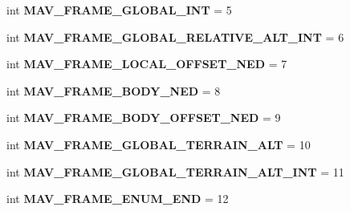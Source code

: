\begin{DoxyCompactItemize}
\item 
\mbox{\label{namespacepymavlink_1_1dialects_1_1v10_a7505e0831f3f4c8ef6e021f8d89be196}} 
int {\bfseries M\+A\+V\+\_\+\+F\+R\+A\+M\+E\+\_\+\+G\+L\+O\+B\+A\+L\+\_\+\+I\+NT} = 5
\item 
\mbox{\label{namespacepymavlink_1_1dialects_1_1v10_a5db5903baa397a551a9587f81c3d21b1}} 
int {\bfseries M\+A\+V\+\_\+\+F\+R\+A\+M\+E\+\_\+\+G\+L\+O\+B\+A\+L\+\_\+\+R\+E\+L\+A\+T\+I\+V\+E\+\_\+\+A\+L\+T\+\_\+\+I\+NT} = 6
\item 
\mbox{\label{namespacepymavlink_1_1dialects_1_1v10_aa8f0bfdb8cbfd660055834445a31e715}} 
int {\bfseries M\+A\+V\+\_\+\+F\+R\+A\+M\+E\+\_\+\+L\+O\+C\+A\+L\+\_\+\+O\+F\+F\+S\+E\+T\+\_\+\+N\+ED} = 7
\item 
\mbox{\label{namespacepymavlink_1_1dialects_1_1v10_afa563258dc6554e4221e6841620743ad}} 
int {\bfseries M\+A\+V\+\_\+\+F\+R\+A\+M\+E\+\_\+\+B\+O\+D\+Y\+\_\+\+N\+ED} = 8
\item 
\mbox{\label{namespacepymavlink_1_1dialects_1_1v10_ac4415789178ef45d0515d368e2e76ae8}} 
int {\bfseries M\+A\+V\+\_\+\+F\+R\+A\+M\+E\+\_\+\+B\+O\+D\+Y\+\_\+\+O\+F\+F\+S\+E\+T\+\_\+\+N\+ED} = 9
\item 
\mbox{\label{namespacepymavlink_1_1dialects_1_1v10_ac932a6a37e76e05f1680f92688b38385}} 
int {\bfseries M\+A\+V\+\_\+\+F\+R\+A\+M\+E\+\_\+\+G\+L\+O\+B\+A\+L\+\_\+\+T\+E\+R\+R\+A\+I\+N\+\_\+\+A\+LT} = 10
\item 
\mbox{\label{namespacepymavlink_1_1dialects_1_1v10_a68e7d3a8b44c035a0551dd59724d81e5}} 
int {\bfseries M\+A\+V\+\_\+\+F\+R\+A\+M\+E\+\_\+\+G\+L\+O\+B\+A\+L\+\_\+\+T\+E\+R\+R\+A\+I\+N\+\_\+\+A\+L\+T\+\_\+\+I\+NT} = 11
\item 
\mbox{\label{namespacepymavlink_1_1dialects_1_1v10_a0824dafa58e145f86e62a0dd077761a9}} 
int {\bfseries M\+A\+V\+\_\+\+F\+R\+A\+M\+E\+\_\+\+E\+N\+U\+M\+\_\+\+E\+ND} = 12
\item 

\end{DoxyCompactItemize}
